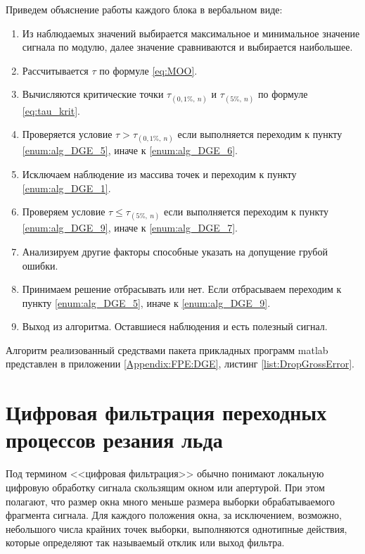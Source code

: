 Приведем объяснение работы каждого блока в вербальном виде:
\begin{enumerate}
	\item Из наблюдаемых значений выбирается максимальное и минимальное значение сигнала по модулю, далее значение сравниваются и выбирается наибольшее.\label{enum:alg_DGE_1}
	\item Рассчитывается $ \tau $ по формуле \ref{eq:MOO}.
	\item Вычисляются критические точки $ \tau_{(0,1\%,\ n)} $ и $ \tau_{(5\%,\ n)} $ по формуле \ref{eq:tau_krit}.
	\item Проверяется условие $ \tau > \tau_{(0,1\%,\ n)} $ если выполняется переходим к пункту \ref{enum:alg_DGE_5}, иначе к \ref{enum:alg_DGE_6}.
	\item Исключаем наблюдение из массива точек и переходим к пункту \ref{enum:alg_DGE_1}.\label{enum:alg_DGE_5}
	\item Проверяем условие $ \tau \leqslant \tau_{(5\%,\ n)} $ если выполняется переходим к пункту \ref{enum:alg_DGE_9}, иначе к \ref{enum:alg_DGE_7}.\label{enum:alg_DGE_6}
	\item Анализируем другие факторы способные указать на допущение грубой ошибки.\label{enum:alg_DGE_7}
	\item Принимаем решение отбрасывать или нет. Если отбрасываем переходим к пункту \ref{enum:alg_DGE_5}, иначе к \ref{enum:alg_DGE_9}.\label{enum:alg_DGE_8}
	\item Выход из алгоритма. Оставшиеся наблюдения и есть полезный сигнал.\label{enum:alg_DGE_9}
\end{enumerate}

Алгоритм реализованный средствами пакета прикладных программ matlab представлен в приложении \ref{Appendix:FPE:DGE}, листинг \ref{list:DropGrossError}.

\section{Цифровая фильтрация переходных процессов резания льда}\label{sect:filtring}

Под термином <<цифровая фильтрация>> обычно понимают локальную цифровую обработку сигнала скользящим окном или апертурой. При этом полагают, что размер окна много меньше размера выборки обрабатываемого фрагмента сигнала. Для каждого положения окна, за исключением, возможно, небольшого числа крайних точек выборки, выполняются однотипные действия, которые определяют так называемый отклик или выход фильтра\cite{Oppengeym}.

